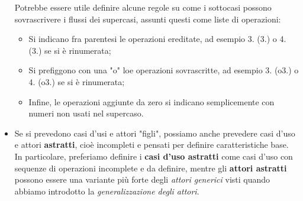 \documentclass[a4paper,11pt]{article}
\begin{document}
\begin{itemize}
		Potrebbe essere utile definire alcune regole su come i sottocasi possono sovrascrivere i flussi dei supercasi, assunti questi come liste di operazioni:
		\begin{itemize}
			\item Si indicano fra parentesi le operazioni ereditate, ad esempio 3. (3.) o 4. (3.) se si è rinumerata;
			\item Si prefiggono con una "o" loe operazioni sovrascritte, ad esempio 3. (o3.) o 4. (o3.) se si è rinumerata;
			\item Infine, le operazioni aggiunte da zero si indicano semplicemente con numeri non usati nel supercaso. 
		\end{itemize}
	\item Se si prevedono casi d'usi e attori "figli", possiamo anche prevedere casi d'uso e attori \textbf{astratti}, cioè incompleti e pensati per definire caratteristiche base. In particolare, preferiamo definire i \textbf{casi d'uso astratti} come casi d'uso con sequenze di operazioni incomplete e da definire, mentre gli \textbf{attori astratti} possono essere una variante più forte degli \textit{attori generici} visti quando abbiamo introdotto la \textit{generalizzazione degli attori}. 
\end{itemize}
\end{document}
